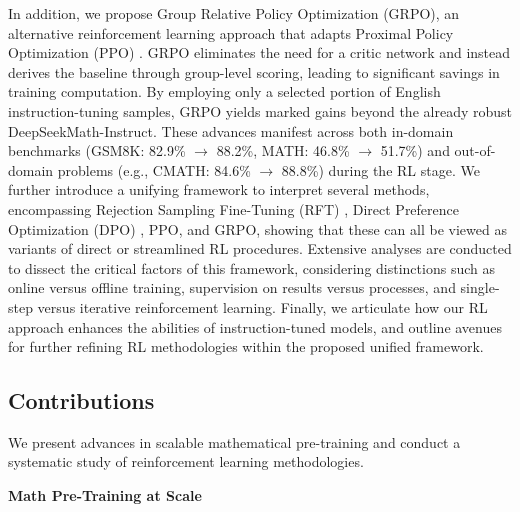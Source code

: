 In addition, we propose Group Relative Policy Optimization (GRPO), an alternative reinforcement learning approach that adapts Proximal Policy Optimization (PPO) \citep{schulman2017proximal}. GRPO eliminates the need for a critic network and instead derives the baseline through group-level scoring, leading to significant savings in training computation. By employing only a selected portion of English instruction-tuning samples, GRPO yields marked gains beyond the already robust DeepSeekMath-Instruct. These advances manifest across both in-domain benchmarks (GSM8K: 82.9\% $\rightarrow$ 88.2\%, MATH: 46.8\% $\rightarrow$ 51.7\%) and out-of-domain problems (e.g., CMATH: 84.6\% $\rightarrow$ 88.8\%) during the RL stage. We further introduce a unifying framework to interpret several methods, encompassing Rejection Sampling Fine-Tuning (RFT) \citep{yuan2023scaling}, Direct Preference Optimization (DPO) \citep{dpo}, PPO, and GRPO, showing that these can all be viewed as variants of direct or streamlined RL procedures. Extensive analyses are conducted to dissect the critical factors of this framework, considering distinctions such as online versus offline training, supervision on results versus processes, and single-step versus iterative reinforcement learning. Finally, we articulate how our RL approach enhances the abilities of instruction-tuned models, and outline avenues for further refining RL methodologies within the proposed unified framework.

\subsection{Contributions}
We present advances in scalable mathematical pre-training and conduct a systematic study of reinforcement learning methodologies.

\textbf{Math Pre-Training at Scale}

